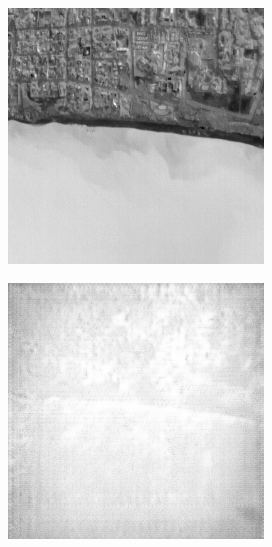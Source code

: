 \begin{figure}
    \begin{subfigure}[b]{0.19\textwidth}
        \centering
        \includegraphics[width=\textwidth]{../figs/outputs/pan/28.png}
        \label{fig:pan}
    \end{subfigure}
    \hfill
    \begin{subfigure}[b]{0.19\textwidth}
        \centering
        \includegraphics[width=\textwidth]{../figs/outputs/cycleGan/28.png}

\end{subfigure}
\end{figure}

